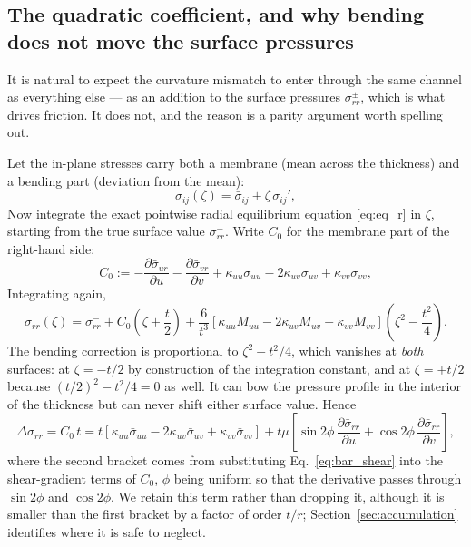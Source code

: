 \documentclass[11pt]{article}
\begin{document}
\subsection{The quadratic coefficient, and why bending does not move the surface pressures}
\label{sec:P_determined}
It is natural to expect the curvature mismatch to enter through the same channel
as everything else --- as an addition to the surface pressures
$\sigma_{rr}^{\pm}$, which is what drives friction. It does not, and the reason
is a parity argument worth spelling out.

Let the in-plane stresses carry both a membrane (mean across the thickness) and a bending part (deviation from the mean):
\begin{equation}
    \sigma_{ij}(\zeta) = \bar\sigma_{ij} + \zeta\,\sigma_{ij}',
\end{equation}
Now integrate the exact pointwise radial equilibrium equation \eqref{eq:eq_r} in
$\zeta$, starting from the true surface value $\sigma_{rr}^{-}$. 
Write $C_0$ for the membrane part of the right-hand side:
\begin{equation}\label{eq:C0_def}
    C_0 := -\frac{\partial \bar\sigma_{ur}}{\partial u}
      - \frac{\partial \bar\sigma_{vr}}{\partial v}
      + \kappa_{uu}\bar\sigma_{uu} - 2\kappa_{uv}\bar\sigma_{uv}
      + \kappa_{vv}\bar\sigma_{vv},
\end{equation}
Integrating again,
\begin{equation}\label{eq:sigma_rr_profile}
    \sigma_{rr}(\zeta) = \sigma_{rr}^{-}
      + C_0\left(\zeta + \frac{t}{2}\right)
      + \frac{6}{t^{3}}\left[\kappa_{uu}M_{uu} - 2\kappa_{uv}M_{uv}
        + \kappa_{vv}M_{vv}\right]
        \left(\zeta^{2} - \frac{t^{2}}{4}\right).
\end{equation}
The bending correction is proportional to $\zeta^{2} - t^{2}/4$, which vanishes
at \emph{both} surfaces: at $\zeta = -t/2$ by construction of the integration
constant, and at $\zeta = +t/2$ because $(t/2)^{2} - t^{2}/4 = 0$ as well. It can
bow the pressure profile in the interior of the thickness but can never shift
either surface value. Hence
\begin{equation}\label{eq:outofplane_exact}
    \boxed{\;\Delta\sigma_{rr} = C_0\,t
      = t\left[\kappa_{uu}\bar\sigma_{uu} - 2\kappa_{uv}\bar\sigma_{uv}
        + \kappa_{vv}\bar\sigma_{vv}\right]
      + t\mu\left[\sin 2\phi\,
        \frac{\partial \bar\sigma_{rr}}{\partial u}
        + \cos 2\phi\,\frac{\partial \bar\sigma_{rr}}{\partial v}\right],\;}
\end{equation}
where the second bracket comes from substituting Eq.~\eqref{eq:bar_shear} into
the shear-gradient terms of $C_0$, $\phi$ being uniform so that the derivative
passes through $\sin 2\phi$ and $\cos 2\phi$. We retain this term rather than
dropping it, although it is smaller than the first bracket by a factor of order
$t/r$; Section~\ref{sec:accumulation} identifies where it is safe to neglect.
\end{document}

